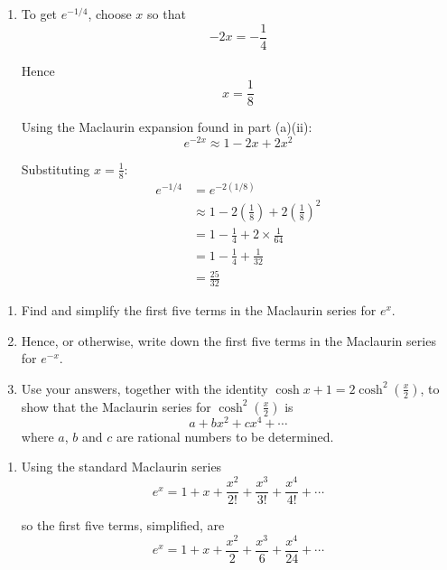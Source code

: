 \documentclass[leqno]{article}
\begin{document}
\begin{enumerate}[
  label=\textbf{\arabic*.},
  leftmargin=*,
  topsep=0pt,
  partopsep=0pt,
  parsep=0pt
]
\begin{djsSolution}
\begin{enumerate}[label=\textbf{(\alph*)}]
  \item To get \(e^{-1/4}\), choose \(x\) so that
  \[
  -2x=-\frac14
  \]

  Hence
  \[
  x=\frac18
  \]

  Using the Maclaurin expansion found in part (a)(ii):
  \[
  e^{-2x}\approx 1-2x+2x^2
  \]

  Substituting \(x=\frac18\):
  \begin{align*}
  e^{-1/4}
  &=e^{-2(1/8)} \\
  &\approx 1-2\left(\frac18\right)+2\left(\frac18\right)^2 \\
  &=1-\frac14+2\times\frac{1}{64} \\
  &=1-\frac14+\frac{1}{32} \\
  &=\frac{25}{32}
  \end{align*}
\end{enumerate}
\end{djsSolution}


\newpage

\questionitem

\begin{enumerate}[label=\textbf{(\alph*)}]
  \item Find and simplify the first five terms in the Maclaurin series for $e^x$.  \\
  \item Hence, or otherwise, write down the first five terms in the Maclaurin series for $e^{-x}$.  \\
  \item Use your answers, together with the identity $\cosh x + 1 = 2\cosh^2\left(\frac{x}{2}\right)$, to show that the Maclaurin series for $\cosh^2\left(\frac{x}{2}\right)$ is
  \[
  a + bx^2 + cx^4 + \cdots
  \]
  where $a$, $b$ and $c$ are rational numbers to be determined.  \\
\end{enumerate}

\vspace*{10pt}

\begin{djsSolution}
\begin{enumerate}[label=\textbf{(\alph*)}]
  \item Using the standard Maclaurin series
\[
e^x=1+x+\frac{x^2}{2!}+\frac{x^3}{3!}+\frac{x^4}{4!}+\cdots
\]

so the first five terms, simplified, are
\[
e^x=1+x+\frac{x^2}{2}+\frac{x^3}{6}+\frac{x^4}{24}+\cdots
\]


\end{enumerate}
\end{djsSolution}
\end{enumerate}
\end{document}

